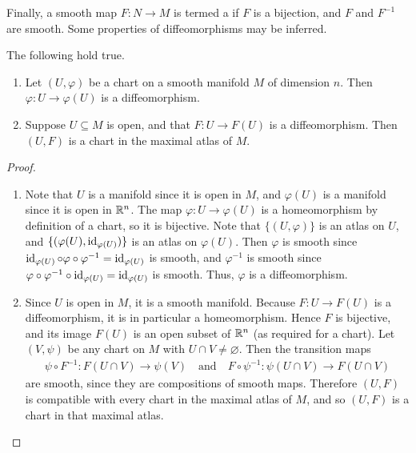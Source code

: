 Finally, a smooth map $F:N \to M$ is termed a  if $F$ is a bijection, and $F$ and $F^{-1}$ are smooth. Some properties of diffeomorphisms may be inferred.

\begin{proposition}
    The following hold true.
    \begin{enumerate}
        \item Let $(U,\varphi)$ be a chart on a smooth manifold $M$ of dimension $n$. Then $\varphi:U \to \varphi(U)$ is a diffeomorphism.
        \item Suppose $U \subseteq M$ is open, and that $F:U \to F(U)$ is a diffeomorphism. Then $(U,F)$ is a chart in the maximal atlas of $M$.
    \end{enumerate}
\end{proposition}
\begin{proof}
    \begin{enumerate}
        \item Note that $U$ is a manifold since it is open in $M$, and $\varphi(U)$ is a manifold since it is open in $\mathbb{R}^{n}$. The map $\varphi:U \to \varphi(U)$ is a homeomorphism by definition of a chart, so it is bijective. Note that $\{(U,\varphi)\}$ is an atlas on $U$, and $\{(\varphi(U),\operatorname{id}_{\varphi(U)})\}$ is an atlas on $\varphi(U)$. Then $\varphi$ is smooth since $\operatorname{id}_{\varphi(U)} \circ \varphi \circ \varphi^{-1} = \operatorname{id}_{\varphi(U)}$ is smooth, and $\varphi^{-1}$ is smooth since $\varphi \circ \varphi^{-1} \circ \operatorname{id}_{\varphi(U)} = \operatorname{id}_{\varphi(U)}$ is smooth. Thus, $\varphi$ is a diffeomorphism.
        
        \item Since $U$ is open in $M$, it is a smooth manifold. Because $F:U\to F(U)$ is a diffeomorphism, it is in particular a homeomorphism. Hence $F$ is bijective, and its image $F(U)$ is an open subset of $\mathbb{R}^{n}$ (as required for a chart). Let $(V,\psi)$ be any chart on $M$ with $U\cap V\neq\varnothing$. Then the transition maps
        \begin{align}
            \psi\circ F^{-1}:F(U\cap V)\to \psi(V) \quad \text{and} \quad F\circ \psi^{-1}:\psi(U\cap V)\to F(U\cap V)
        \end{align}
        are smooth, since they are compositions of smooth maps. Therefore $(U,F)$ is compatible with every chart in the maximal atlas of $M$, and so $(U,F)$ is a chart in that maximal atlas.
    \end{enumerate}
\end{proof}

